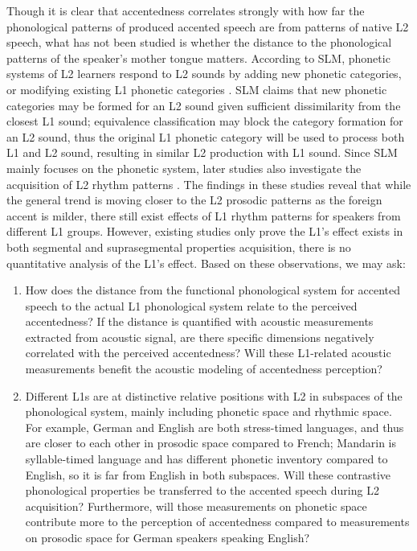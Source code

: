 Though it is clear that accentedness correlates strongly with how far the phonological patterns of produced accented speech are from patterns of native L2 speech, what has not been studied is whether the distance to the phonological patterns of the speaker's mother tongue matters. According to SLM, phonetic systems of L2 learners respond to L2 sounds by adding new phonetic categories, or modifying existing L1 phonetic categories \citep{flege1995second}. SLM claims that new phonetic categories may be formed for an L2 sound given sufficient dissimilarity from the closest L1 sound; equivalence classification may block the category formation for an L2 sound, thus the original L1 phonetic category will be used to process both L1 and L2 sound, resulting in similar L2 production with L1 sound. Since SLM mainly focuses on the phonetic system, later studies also investigate the acquisition of L2 rhythm patterns \citep{rasier2007prosodic,ordin2015acquisition}. The findings in these studies reveal that while the general trend is moving closer to the L2 prosodic patterns as the foreign accent is milder, there still exist effects of L1 rhythm patterns for speakers from different L1 groups. However, existing studies only prove the L1's effect exists in both segmental and suprasegmental properties acquisition, there is no quantitative analysis of the L1's effect. Based on these observations, we may ask:

\begin{enumerate}
\item How does the distance from the functional phonological system for accented speech to the actual L1 phonological system relate to the perceived accentedness?  If the distance is quantified with acoustic measurements extracted from acoustic signal, are there specific dimensions negatively correlated with the perceived accentedness?
    Will these L1-related acoustic measurements benefit the acoustic modeling of accentedness perception?
\item Different L1s are at distinctive relative positions with L2 in subspaces of the phonological system, mainly including phonetic space and rhythmic space. For example, German and English are both stress-timed languages, and thus are closer to each other in prosodic space compared to French; Mandarin is syllable-timed language and has different phonetic inventory compared to English, so it is far from English in both subspaces. Will these contrastive phonological properties be transferred to the accented speech during L2 acquisition? Furthermore, will those measurements on phonetic space contribute more to the perception of accentedness compared to measurements on prosodic space for German speakers speaking English?
\end{enumerate}

